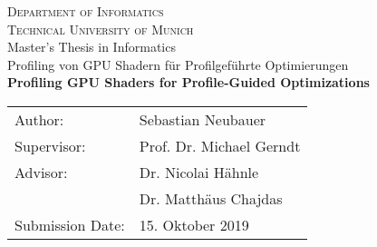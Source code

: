 \newpage
\begin{center}
  \vspace*{3cm}

  \vspace*{0.5cm}
  {\huge \textsc{Department of Informatics}}\\
  \vspace{0.25cm}
  {\Large \textsc{Technical University of Munich}} \\
  \vspace*{2cm}
  {\large Master's Thesis in Informatics} \\
  \vspace*{1cm}
  {\huge Profiling von GPU Shadern für Profilgeführte Optimierungen} \\
  \vspace*{1cm}
  {\huge \textbf{Profiling GPU Shaders for Profile-Guided Optimizations} \\}
  \vspace*{2.5cm}
  {\large
  \begin{tabular}{ll}
  Author:         & Sebastian Neubauer \\
  Supervisor:     & Prof. Dr. Michael Gerndt\\
  Advisor:        & Dr. Nicolai Hähnle\\
                  & Dr. Matthäus Chajdas\\
  Submission Date:& 15. Oktober 2019
  \end{tabular}
  }
\end{center}
